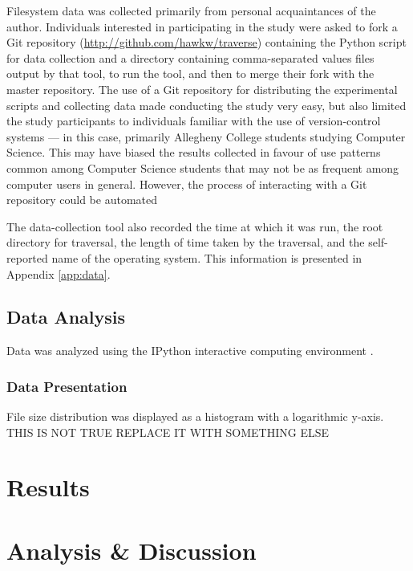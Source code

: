 \documentclass[12pt,a4paper]{article}
\begin{document}
			Filesystem data was collected primarily from personal acquaintances of the author. Individuals interested in participating in the study were asked to fork a Git repository (\url{http://github.com/hawkw/traverse}) containing the Python script for data collection and a directory containing comma-separated values files output by that tool, to run the tool, and then to merge their fork with the master repository. The use of a Git repository for distributing the experimental scripts and collecting data made conducting the study very easy, but also limited the study participants to individuals familiar with the use of version-control systems --- in this case, primarily Allegheny College students studying Computer Science. This may have biased the results collected in favour of use patterns common among Computer Science students that may not be as frequent among computer users in general. However, the process of interacting with a Git repository could be automated 

			The data-collection tool also recorded the time at which it was run, the root directory for traversal, the length of time taken by the traversal,  and the self-reported name of the operating system. This information is presented in Appendix \ref{app:data}.

		\subsection{Data Analysis}

			Data was analyzed using the IPython interactive computing environment \cite{PER-GRA:2007}.

			\subsubsection{Data Presentation}

				File size distribution was displayed as a histogram with a logarithmic y-axis. THIS IS NOT TRUE REPLACE IT WITH SOMETHING ELSE

	\section{Results}

	\section{Analysis \& Discussion}
\end{document}
